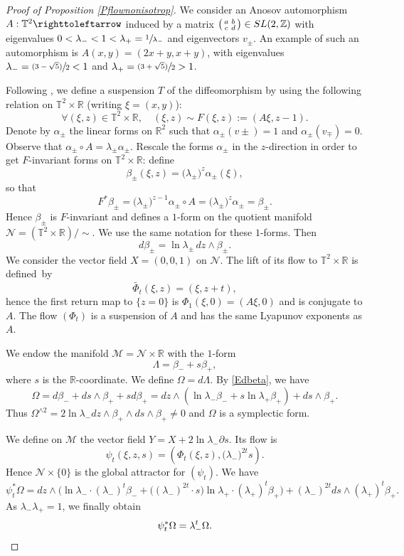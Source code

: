\documentclass[10pt]{amsart}
\newcommand{\psfrac}[2]{\sfrac{(#1)}{#2}}
\newenvironment{smallpmatrix}{\big(\begin{smallmatrix}}{\end{smallmatrix}\big)}
\theoremstyle{definition}
\def\R{\mathbb{R}}
\def\Z{\mathbb{Z}}
\def\T{\mathbb{T}}
\def\cM{{\mathcal M}}
\def\cN{{\mathcal N}}
\begin{document}
\begin{proof}[Proof of Proposition \ref{Pflownonisotrop}]We consider an Anosov automorphism $A: \T^2\righttoleftarrow$ induced by a matrix $\begin{smallpmatrix}
a &b\\
c &d
\end{smallpmatrix} \in SL(2, \Z)$ with eigenvalues $0<\lambda_-< 1 < \lambda_+=\sfrac{1}{\lambda_-}$ and eigenvectors $v_\pm$. An example of such an automorphism is
$A(x,y)=(2x+y, x+y)$, with eigenvalues $\lambda_-=\psfrac{3-\sqrt{5}}{2}<1$ and
$\lambda_+=\psfrac{3+\sqrt{5}}{2}>1$.

Following \cite{ArnoldAvez1967}, we define a suspension $T$ of the diffeomorphism by using the following relation on $\T^2\times \R$ (writing $\xi=(x,y)$):
\[
\forall (\xi,z)\in\T^2\times \R,\quad (\xi,z)\sim F(\xi,z) := (A\xi, z-1).
\]
Denote by $\alpha_\pm$ the linear forms on $\R^2$ such that $\alpha_\pm(v\pm)=1$ and $\alpha_\pm(v_\mp)=0$. Observe that $\alpha_\pm\circ A=\lambda_\pm\alpha_\pm$. Rescale the forms $\alpha_\pm$ in the $z$-direction in order to get $F$\nobreakdash-in\-vari\-ant forms on $\T^2\times \R$: define
\[
\beta_\pm(\xi,z)=\big(\lambda_\pm\big)^z\alpha_\pm(\xi),
\]
so that
\[
F^*\beta_\pm=\big(\lambda_\pm\big)^{z-1}\alpha_\pm\circ A=\big(\lambda_\pm\big)^z\alpha_\pm=\beta_\pm.
\]
Hence $\beta_\pm$ is $F$-invariant and defines a $1$-form on
the quotient manifold \hbox{$\cN\!=\!(\T^2\!\times\!\R)/{\sim}$}. We use the same notation for these $1$-forms. Then
\begin{equation}\label{Edbeta}
d\beta_\pm=\ln\lambda_\pm \, dz\wedge\beta_\pm.
\end{equation}
We consider the vector field $X\!=\!(0, 0, 1)$ on $\cN$. The lift of its flow to $\T^2\!\times\! \R$ is defined~by
\[
\widetilde{\Phi_t}(\xi, z)=(\xi, z+t),
\]
hence the first return map to $\{z=0\}$ is $\Phi_1(\xi, 0)=(A\xi, 0)$ and is conjugate to $A$. The flow $(\Phi_t)$ is a suspension of $A$ and has the same Lyapunov exponents as $A$.

We endow the manifold $\cM=\cN\times\R$ with the $1$-form
\[
\Lambda=\beta_-+s\beta_+,
\]
where $s$ is the $\R$-coordinate. We define
$\Omega=d\Lambda$. By \eqref{Edbeta}, we have
\[
\Omega=d\beta_-+ds\wedge \beta_++sd\beta_+=dz\wedge (\ln\lambda_-\beta_-+s\ln\lambda_+\beta_+)+ds\wedge\beta_+.
\]
Thus $\Omega^{\wedge 2}= 2\ln\lambda_- dz\wedge \beta_+\wedge ds \wedge \beta_+\not=0$ and $\Omega$ is a symplectic form.

We define on $\cM$ the vector field $Y=X+2\ln \lambda_-\partial s$. Its flow is
\[
\psi_t(\xi, z, s)=(\Phi_t(\xi, z), \big(\lambda_-\big)^{2t}s).
\]
Hence $\cN\times \{ 0\}$ is the global attractor for $(\psi_t)$.
We have
\[
\psi_t^*\Omega=dz\wedge\Big(\ln\lambda_-\cdot(\lambda_-)^t\beta_-+\big((\lambda_-)^{2t}\cdot s\big)\ln\lambda_+\cdot(\lambda_+)^t\beta_+\Big)+(\lambda_-)^{2t}ds\wedge(\lambda_+)^t\beta_+.
\]
As $\lambda_-\lambda_+=1$, we finally obtain
\[
\psi_t^*\Omega=\lambda_-^t\Omega.\qedhere
\]
\end{proof}
\end{document}
